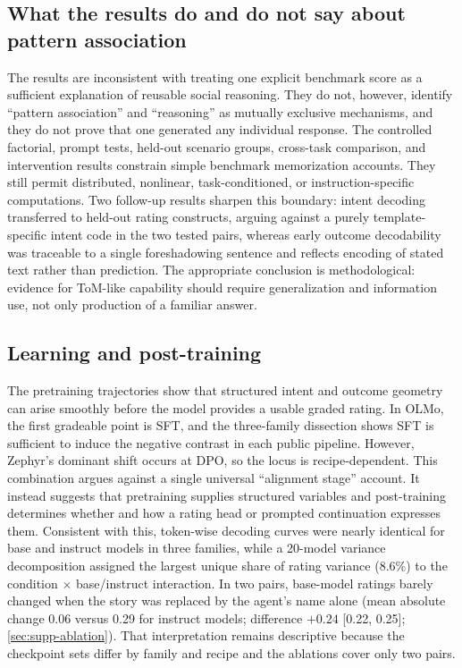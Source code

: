 \documentclass[11pt]{article}
\begin{document}
\subsection{What the results do and do not say about pattern association}

The results are inconsistent with treating one explicit benchmark score as a sufficient explanation of reusable social reasoning.
They do not, however, identify ``pattern association'' and ``reasoning'' as mutually exclusive mechanisms, and they do not prove that one generated any individual response.
The controlled factorial, prompt tests, held-out scenario groups, cross-task comparison, and intervention results constrain simple benchmark memorization accounts.
They still permit distributed, nonlinear, task-conditioned, or instruction-specific computations.
Two follow-up results sharpen this boundary: intent decoding transferred to held-out rating constructs, arguing against a purely template-specific intent code in the two tested pairs, whereas early outcome decodability was traceable to a single foreshadowing sentence and reflects encoding of stated text rather than prediction.
The appropriate conclusion is methodological: evidence for ToM-like capability should require generalization and information use, not only production of a familiar answer.

\subsection{Learning and post-training}

The pretraining trajectories show that structured intent and outcome geometry can arise smoothly before the model provides a usable graded rating.
In OLMo, the first gradeable point is SFT, and the three-family dissection shows SFT is sufficient to induce the negative contrast in each public pipeline.
However, Zephyr's dominant shift occurs at DPO, so the locus is recipe-dependent.
This combination argues against a single universal ``alignment stage'' account.
It instead suggests that pretraining supplies structured variables and post-training determines whether and how a rating head or prompted continuation expresses them.
Consistent with this, token-wise decoding curves were nearly identical for base and instruct models in three families, while a 20-model variance decomposition assigned the largest unique share of rating variance (8.6\%) to the condition $\times$ base/instruct interaction.
In two pairs, base-model ratings barely changed when the story was replaced by the agent's name alone (mean absolute change 0.06 versus 0.29 for instruct models; difference $+0.24$ [0.22, 0.25]; \cref{sec:supp-ablation}).
That interpretation remains descriptive because the checkpoint sets differ by family and recipe and the ablations cover only two pairs.
\end{document}
